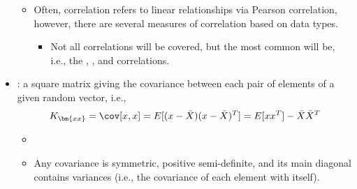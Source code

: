 \begin{itemize}
\begin{itemize}
      \item Often, correlation refers to linear relationships via Pearson correlation, however, there are several measures of correlation based on data types. 
        \begin{itemize}
          \item Not all correlations will be covered, but the most common will be, i.e., the \hyperref[Subsection: Pearson Correlation]{}, \hyperref[Subsection: Spearman Correlation]{}, and \hyperref[Subsection: Kendall Correlation]{} correlations. 
        \end{itemize}
    \end{itemize}
  \item {}: a square matrix giving the covariance between each pair of elements of a given random vector, i.e.,
  \[%
  K_{\bm{xx}} = \cov[x,x] = E[(x-\bar{X})(x-\bar{X})^T] = E[xx^T] - \bar{X}\bar{X}^T
  \]%
  
    \begin{itemize}
      \item {}
      \item Any covariance is symmetric, positive semi-definite, and its main diagonal contains variances (i.e., the covariance of each element with itself).
    \end{itemize}
  

\end{itemize}
